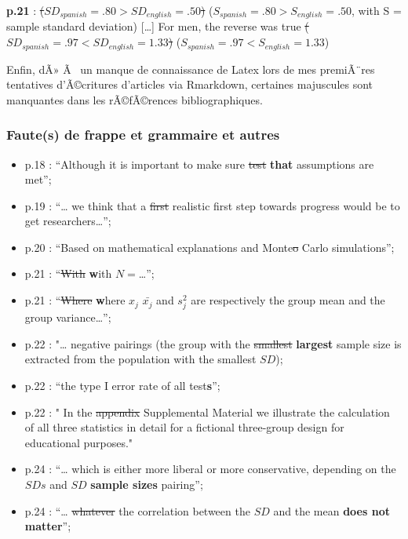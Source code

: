 \begin{appendix}
\textbf{p.21} :
\sout{(\(SD_{spanish}=.80 > SD_{english}=.50\)\color{blue})}
(\(S_{spanish}=.80 > S_{english}=.50\)\color{blue}, with S = sample
standard deviation) {[}\ldots{]} \color{black}For men, the reverse was
true \sout{(\(SD_{spanish}=.97 < SD_{english}=1.33\))}
(\(S_{spanish}=.97 < S_{english}=1.33\))

Enfin, dÃ» Ã~ un manque de connaissance de Latex lors de mes premiÃ¨res
tentatives d'Ã©critures d'articles via Rmarkdown, certaines majuscules
sont manquantes dans les rÃ©fÃ©rences bibliographiques.

\hypertarget{fautes-de-frappe-et-grammaire-et-autres}{%
\subsubsection{Faute(s) de frappe et grammaire et
autres}\label{fautes-de-frappe-et-grammaire-et-autres}}

\begin{itemize}
\tightlist
\item
  p.18 : ``Although it is important to make sure \sout{test}
  \textbf{that} assumptions are met'';\\
\item
  p.19 : ``\ldots{} we think that a \sout{first} realistic first step
  towards progress would be to get researchers\ldots{}'';\\
\item
  p.20 : ``Based on mathematical explanations and Monte\sout{o} Carlo
  simulations'';\\
\item
  p.21 : ``\sout{With} \textbf{w}ith \(N=\)\ldots{}'';\\
\item
  p.21 : ``\sout{Where} \textbf{w}here \sout{\(x_j\)} \(\bar{x_j}\) and
  \(s^2_j\) are respectively the group mean and the group
  variance\ldots{}'';\\
\item
  p.22 : "\ldots{} negative pairings (the group with the \sout{smallest}
  \textbf{largest} sample size is extracted from the population with the
  smallest \(SD\));\\
\item
  p.22 : ``the type I error rate of all test\textbf{s}'';
\item
  p.22 : " In the \sout{appendix} Supplemental Material we illustrate
  the calculation of all three statistics in detail for a fictional
  three-group design for educational purposes."
\item
  p.24 : ``\ldots{} which is either more liberal or more conservative,
  depending on the \(SDs\) and \sout{\(SD\)} \textbf{sample sizes}
  pairing'';\\
\item
  p.24 : ``\ldots{} \sout{whatever} the correlation between the \(SD\)
  and the mean \textbf{does not matter}'';
\end{itemize}


\end{appendix}
